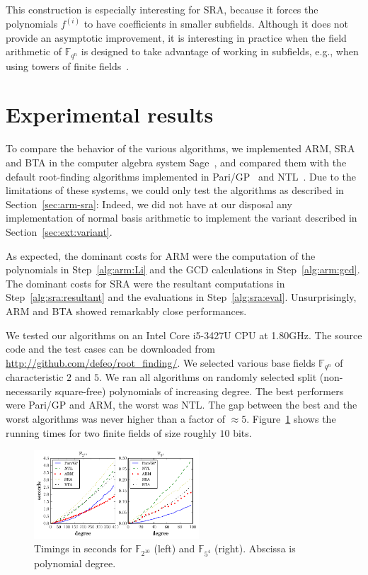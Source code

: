 \documentclass{sig-alternate}
\newcommand{\ff}[1]{\mathbb{F}_{#1}}
\newcommand{\qq}{q}
\newcommand{\nn}{n}
\newcommand{\qn}{{\qq^\nn}}
\newcommand{\extf}{\ff{\qn}}
\newcounter{algo}
\begin{document}
This construction is especially interesting for SRA, because it forces
the polynomials $f^{(i)}$ to have coefficients in smaller
subfields. Although it does not provide an asymptotic improvement, it
is interesting in practice when the field arithmetic of $\extf$ is
designed to take advantage of working in subfields, e.g., when using
towers of finite fields~\cite{df+schost12,DeDoSc13}.



\section{Experimental results}

To compare the behavior of the various algorithms, we implemented ARM,
SRA and BTA in the computer algebra system Sage~\cite{Sage}, and
compared them with the default root-finding algorithms implemented in
Pari/GP~\cite{Pari} and NTL~\cite{ntl}. Due to the limitations of
these systems, we could only test the algorithms as described in
Section~\ref{sec:arm-sra}: Indeed, we did not have at our disposal any
implementation of normal basis arithmetic to implement the variant
described in Section~\ref{sec:ext:variant}.

As expected, the dominant costs for ARM were the computation of the
polynomials in Step~\ref{alg:arm:Li} and the GCD calculations in
Step~\ref{alg:arm:gcd}. The dominant costs for SRA were the resultant
computations in Step~\ref{alg:sra:resultant} and the evaluations in
Step~\ref{alg:sra:eval}. Unsurprisingly, ARM and BTA showed remarkably
close performances.

We tested our algorithms on an Intel Core i5-3427U CPU at 1.80GHz. The
source code and the test cases can be downloaded from
\url{http://github.com/defeo/root_finding/}. We selected various base
fields $\extf$ of characteristic $2$ and $5$. We ran all algorithms on
randomly selected split (non-necessarily square-free) polynomials of
increasing degree. The best performers were Pari/GP and ARM, the worst
was NTL. The gap between the best and the worst algorithms was never
higher than a factor of $\approx 5$. Figure~\ref{fig:benchmarks} shows
the running times for two finite fields of size roughly $10$ bits.

\begin{figure}
  \hspace{-0.05\textwidth}
  \includegraphics[width=0.55\textwidth]{benchmark}
  \caption{Timings in seconds for $\ff{2^{10}}$ (left) and $\ff{5^4}$
    (right). Abscissa is polynomial degree.}
  \label{fig:benchmarks}
\end{figure}
\end{document}
